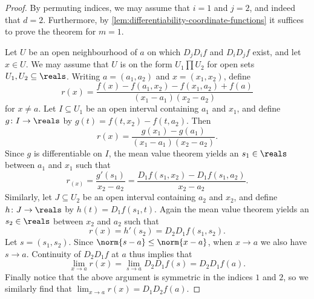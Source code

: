 \documentclass[article, a4paper, 11pt, oneside]{memoir}
\numberwithin{equation}{chapter}
\begin{document}
\begin{proof}
    By permuting indices, we may assume that $i = 1$ and $j = 2$, and indeed that $d = 2$. Furthermore, by \cref{lem:differentiability-coordinate-functions} it suffices to prove the theorem for $m = 1$.

    Let $U$ be an open neighbourhood of $a$ on which $D_j D_i f$ and $D_i D_j f$ exist, and let $x \in U$. We may assume that $U$ is on the form $U_1 \prod U_2$ for open sets $U_1, U_2 \subseteq \reals$. Writing $a = (a_1,a_2)$ and $x = (x_1,x_2)$, define
    \begin{equation*}
        r(x)
            = \frac{f(x) - f(a_1,x_2) - f(x_1,a_2) + f(a)}{(x_1 - a_1)(x_2 - a_2)}
    \end{equation*}
    for $x \neq a$. Let $I \subseteq U_1$ be an open interval containing $a_1$ and $x_1$, and define $g \colon I \to \reals$ by $g(t) = f(t,x_2) - f(t,a_2)$. Then
    \begin{equation*}
        r(x)
            = \frac{g(x_1) - g(a_1)}{(x_1 - a_1)(x_2 - a_2)}.
    \end{equation*}
    Since $g$ is differentiable on $I$, the mean value theorem yields an $s_1 \in \reals$ between $a_1$ and $x_1$ such that
    \begin{equation*}
        r_(x)
            = \frac{g'(s_1)}{x_2 - a_2}
            = \frac{D_1 f(s_1,x_2) - D_1 f(s_1,a_2)}{x_2 - a_2}.
    \end{equation*}
    Similarly, let $J \subseteq U_2$ be an open interval containing $a_2$ and $x_2$, and define $h \colon J \to \reals$ by $h(t) = D_1 f(s_1,t)$. Again the mean value theorem yields an $s_2 \in \reals$ between $x_2$ and $a_2$ such that
    \begin{equation*}
        r(x)
            = h'(s_2)
            = D_2 D_1 f(s_1, s_2).
    \end{equation*}
    Let $s = (s_1,s_2)$. Since $\norm{s - a} \leq \norm{x - a}$, when $x \to a$ we also have $s \to a$. Continuity of $D_2 D_1 f$ at $a$ thus implies that
    \begin{equation*}
        \lim_{x \to a} r(x)
            = \lim_{s \to a} D_2 D_1 f(s)
            = D_2 D_1 f(a).
    \end{equation*}
    Finally notice that the above argument is symmetric in the indices $1$ and $2$, so we similarly find that $\lim_{x \to a} r(x) = D_1 D_2 f(a)$.
\end{proof}
\end{document}
